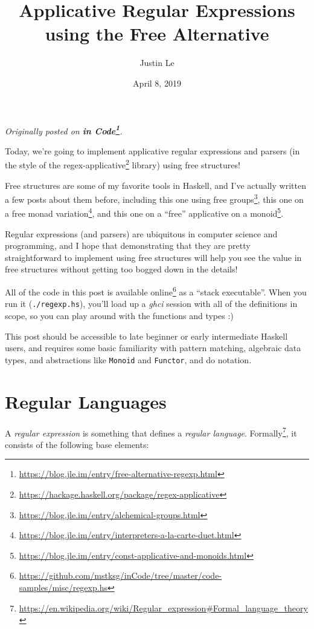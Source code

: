 \documentclass[]{article}
\title{Applicative Regular Expressions using the Free Alternative}
\author{Justin Le}
\date{April 8, 2019}
\renewcommand{\href}[2]{#2\footnote{\url{#1}}}
\begin{document}
\maketitle

\emph{Originally posted on
\textbf{\href{https://blog.jle.im/entry/free-alternative-regexp.html}{in
Code}}.}

Today, we're going to implement applicative regular expressions and parsers (in
the style of the
\href{https://hackage.haskell.org/package/regex-applicative}{regex-applicative}
library) using free structures!

Free structures are some of my favorite tools in Haskell, and I've actually
written a few posts about them before, including
\href{https://blog.jle.im/entry/alchemical-groups.html}{this one using free
groups}, \href{https://blog.jle.im/entry/interpreters-a-la-carte-duet.html}{this
one on a free monad variation}, and
\href{https://blog.jle.im/entry/const-applicative-and-monoids.html}{this one on
a ``free'' applicative on a monoid}.

Regular expressions (and parsers) are ubiquitous in computer science and
programming, and I hope that demonstrating that they are pretty straightforward
to implement using free structures will help you see the value in free
structures without getting too bogged down in the details!

All of the code in this post is
\href{https://github.com/mstksg/inCode/tree/master/code-samples/misc/regexp.hs}{available
online} as a ``stack executable''. When you run it (\texttt{./regexp.hs}),
you'll load up a \emph{ghci} session with all of the definitions in scope, so
you can play around with the functions and types :)

This post should be accessible to late beginner or early intermediate Haskell
users, and requires some basic familiarity with pattern matching, algebraic data
types, and abstractions like \texttt{Monoid} and \texttt{Functor}, and do
notation.

\hypertarget{regular-languages}{%
\section{Regular Languages}\label{regular-languages}}

A \emph{regular expression} is something that defines a \emph{regular language}.
\href{https://en.wikipedia.org/wiki/Regular_expression\#Formal_language_theory}{Formally},
it consists of the following base elements:
\end{document}
